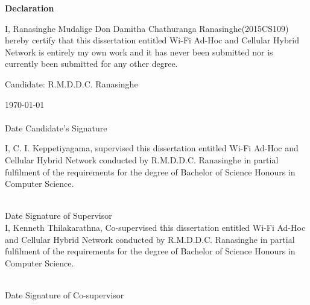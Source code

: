 \begin{center}
\textbf{\Large{Declaration}}
\end{center}
\vspace{0.7cm}
\par
I, Ranasinghe Mudalige Don Damitha Chathuranga Ranasinghe(2015CS109) hereby certify that this dissertation entitled Wi-Fi Ad-Hoc and Cellular Hybrid Network is entirely my own work and it has never been submitted nor is currently been submitted for any other degree.

\vspace{0.5cm}
\noindent
Candidate: R.M.D.D.C. Ranasinghe

\vspace{1cm}
\noindent
\today \\
\makebox[4.5cm]{\dotfill} \hfill \makebox[4.5cm]{\dotfill}\\
\noindent
Date  \hfill Candidate's Signature\\
\vspace{1cm}


I, C. I. Keppetiyagama, supervised this dissertation entitled Wi-Fi Ad-Hoc and Cellular Hybrid Network conducted by R.M.D.D.C. Ranasinghe in partial fulfilment of the requirements for the degree of Bachelor of Science Honours in Computer Science.

\vspace{0.5cm}

\vspace{1cm}
\noindent
\makebox[4.5cm]{\dotfill} \hfill \makebox[4.5cm]{\dotfill}\\
\noindent
Date  \hfill Signature of Supervisor\\

I, Kenneth Thilakarathna, Co-supervised this dissertation entitled Wi-Fi Ad-Hoc and Cellular Hybrid Network conducted by R.M.D.D.C. Ranasinghe in partial fulfilment of the requirements for the degree of Bachelor of Science Honours in Computer Science.

\vspace{0.5cm}


\vspace{1cm}
\noindent
\makebox[4.5cm]{\dotfill} \hfill \makebox[4.5cm]{\dotfill}\\
\noindent
Date  \hfill Signature of Co-supervisor\\




